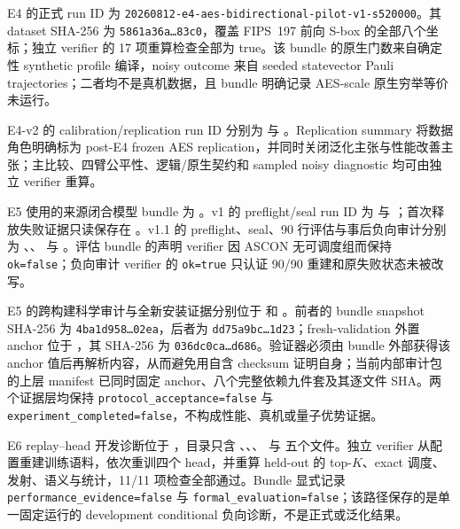 \documentclass[UTF8,fontset=fandol,11pt]{ctexart}
\begin{document}
E4 的正式 run ID 为 \texttt{20260812-e4-aes-bidirectional-pilot-v1-s520000}。其 dataset SHA-256 为 \texttt{5861a36a\ldots83c0}，覆盖 FIPS~197 前向 S-box 的全部八个坐标；独立 verifier 的 17 项重算检查全部为 true。该 bundle 的原生门数来自确定性 synthetic profile 编译，noisy outcome 来自 seeded statevector Pauli trajectories；二者均不是真机数据，且 bundle 明确记录 AES-scale 原生穷举等价未运行。

E4-v2 的 calibration/replication run ID 分别为  与 。Replication summary 将数据角色明确标为 post-E4 frozen AES replication，并同时关闭泛化主张与性能改善主张；主比较、四臂公平性、逻辑/原生契约和 sampled noisy diagnostic 均可由独立 verifier 重算。

E5 使用的来源闭合模型 bundle 为 。v1 的 preflight/seal run ID 为  与 ；首次释放失败证据只读保存在 。v1.1 的 preflight、seal、90 行评估与事后负向审计分别为 、、 与 。评估 bundle 的声明 verifier 因 ASCON 无可调度组而保持 \texttt{ok=false}；负向审计 verifier 的 \texttt{ok=true} 只认证 90/90 重建和原失败状态未被改写。

E5 的跨构建科学审计与全新安装证据分别位于  和 。前者的 bundle snapshot SHA-256 为 \texttt{4ba1d958\ldots02ea}，后者为 \texttt{dd75a9bc\ldots1d23}；fresh-validation 外置 anchor 位于 ，其 SHA-256 为 \texttt{036dc0ca\ldots{}d686}。验证器必须由 bundle 外部获得该 anchor 值后再解析内容，从而避免用自含 checksum 证明自身；当前内部审计包的上层 manifest 已同时固定 anchor、八个完整依赖九件套及其逐文件 SHA。两个证据层均保持 \texttt{protocol\_acceptance=false} 与 \texttt{experiment\_completed=false}，不构成性能、真机或量子优势证据。

E6 replay--head 开发诊断位于 ，目录只含 、、、 与  五个文件。独立 verifier 从配置重建训练语料，依次重训四个 head，并重算 held-out 的 top-$K$、exact 调度、发射、语义与统计，11/11 项检查全部通过。Bundle 显式记录 \texttt{performance\_evidence=false} 与 \texttt{formal\_evaluation=false}；该路径保存的是单一固定运行的 development conditional 负向诊断，不是正式或泛化结果。
\end{document}
